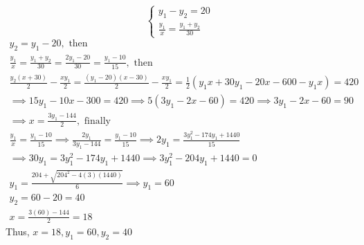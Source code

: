 \documentclass[12pt]{article}
\begin{document}
\begin{enumerate}
\begin{equation*}
\begin{cases}
            y_1-y_2=20 \\
            \displaystyle\frac{y_1}{x} = \displaystyle\frac{y_1+y_2}{30}
        \end{cases}    
        \end{equation*}
    \begin{gather*}
        y_2=y_1-20, \text{ then} \\
        \frac{y_1}{x}=\frac{y_1+y_2}{30}=\frac{2y_1-20}{30}=\frac{y_1-10}{15}, \text{ then} \\
        \frac{y_2(x+30)}{2}-\frac{xy_1}{2}=\frac{(y_1-20)(x-30)}{2}-\frac{xy_1}{2}=\frac{1}{2}{(y_1x+30y_1-20x-600-y_1x)}=420 \\
        \implies 15y_1-10x-300=420 \implies 5(3y_1-2x-60)=420 \implies 3y_1-2x-60=90 \\
        \implies x=\frac{3y_1-144}{2}, \text{ finally} \\
        \frac{y_1}{x}=\frac{y_1-10}{15} \implies \frac{2y_1}{3y_1-144}=\frac{y_1-10}{15} \implies 2y_1=\frac{3y_1^2-174y_1+1440}{15} \\
        \implies 30y_1=3y_1^2-174y_1+1440 \implies 3y_1^2-204y_1+1440=0 \\
        y_1=\frac{204+\sqrt{204^2-4(3)(1440)}}{6} \implies y_1=60\\
        y_2=60-20=40 \\
        x=\frac{3(60)-144}{2}=18
    \end{gather*}
    Thus, $x=18, y_1=60, y_2=40$
\end{enumerate}
\end{document}
